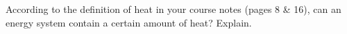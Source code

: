 \label{FNT1.1.3-5}

 According to the definition of heat in your course notes (pages 8 \& 16), can an energy system contain a certain amount of heat? Explain.
